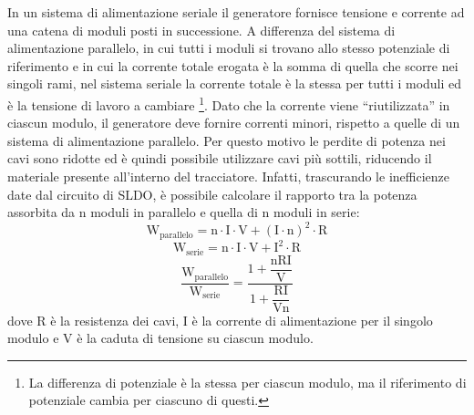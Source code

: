 In un sistema di alimentazione seriale il generatore fornisce tensione e corrente ad una catena di moduli posti in successione. 
A differenza del sistema di alimentazione parallelo, in cui tutti i moduli si trovano allo stesso potenziale di riferimento e in cui la corrente totale erogata è la somma di quella che scorre nei singoli rami, nel sistema seriale la corrente totale è la stessa per tutti i moduli ed è la tensione di lavoro a cambiare
\footnote{
  La differenza di potenziale è la stessa per ciascun modulo, ma il riferimento di potenziale cambia per ciascuno di questi.
}.
Dato che la corrente viene ``riutilizzata'' in ciascun modulo, il generatore deve fornire correnti minori, rispetto a quelle di un sistema di alimentazione parallelo.
Per questo motivo le perdite di potenza nei cavi sono ridotte ed è quindi possibile utilizzare cavi più sottili, riducendo il materiale presente all'interno del tracciatore.
Infatti, trascurando le inefficienze date dal circuito di SLDO, è possibile calcolare il rapporto tra la potenza assorbita da n moduli in parallelo e quella di n moduli in serie:
\begin{equation}
\mathrm{W_{parallelo} = n \cdot I \cdot V + (I\cdot n)^2 \cdot R}
\end{equation}
\begin{equation}
\mathrm{W_{serie} = n \cdot I \cdot V + I^2 \cdot R}
\end{equation}
\begin{equation}
\mathrm{\frac{W_{parallelo}}{W_{serie}} = \frac{1+ \dfrac{nRI}{V}}{1+\dfrac{RI}{Vn}}}
\end{equation}
dove R è la resistenza dei cavi, I è la corrente di alimentazione per il singolo modulo e V è la caduta di tensione su ciascun modulo. 

